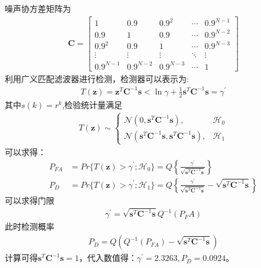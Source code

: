 \documentclass[fontset=windows]{article}
\numberwithin{figure}{section}
\begin{document}
噪声协方差矩阵为
\begin{align*}
	\mathbf{C}=
	\begin{bmatrix}
		1         & 0.9       & 0.9^2     & \cdots & 0.9^{N-1} \\
		0.9       & 1         & 0.9       & \cdots & 0.9^{N-2} \\
		0.9^2     & 0.9       & 1         & \cdots & 0.9^{N-3} \\
		\vdots    & \vdots    & \vdots    & \ddots & \vdots    \\
		0.9^{N-1} & 0.9^{N-2} & 0.9^{N-3} & \cdots & 1
	\end{bmatrix}
\end{align*}
利用广义匹配滤波器进行检测，检测器可以表示为:
\begin{align*}
	T(\mathbf{z})=\mathbf{z}^T\mathbf{C}^{-1}\mathbf{s}<\ln \gamma+\frac{1}{2}\mathbf{s}^T\mathbf{C}^{-1}\mathbf{s}=\gamma^{\prime}
\end{align*}
其中\(s(k)=r^k\),检验统计量满足
\begin{align*}
	T(\mathbf{z})\sim\left\{
	\begin{matrix}
		\mathcal{N}(0,\mathbf{s}^T\mathbf{C}^{-1}\mathbf{s}),                                     & \mathcal{H}_0 \\
		\mathcal{N}(\mathbf{s}^T\mathbf{C}^{-1}\mathbf{s},\mathbf{s}^T\mathbf{C}^{-1}\mathbf{s}), & \mathcal{H}_1
	\end{matrix}
	\right.
\end{align*}
可以求得：
\begin{align*}
	P_{FA} & =Pr\{T(\mathbf{z})>\gamma^{\prime};\mathcal{H}_0\}=Q\left\{\frac{\gamma^{\prime}}{\sqrt{\mathbf{s}^T\mathbf{C}^{-1}\mathbf{s}}}\right\}                                              \\
	P_D    & =Pr\{T(\mathbf{z})>\gamma^{\prime};\mathcal{H}_1\}=Q\left\{\frac{\gamma^{\prime}}{\sqrt{\mathbf{s}^T\mathbf{C}^{-1}\mathbf{s}}}-\sqrt{\mathbf{s}^T\mathbf{C}^{-1}\mathbf{s}}\right\}
\end{align*}
可以求得门限
\begin{align*}
	\gamma^{\prime}=\sqrt{\mathbf{s}^T\mathbf{C}^{-1}\mathbf{s}}Q^{-1}(P_FA)
\end{align*}
此时检测概率
\begin{align*}
	P_D=Q(Q^{-1}(P_{FA})-\sqrt{\mathbf{s}^T\mathbf{C}^{-1}\mathbf{s}})
\end{align*}
计算可得\(\mathbf{s}^T\mathbf{C}^{-1}\mathbf{s}=1\)，代入数值得：\(\gamma^{\prime}=2.3263,P_D=0.0924\)。
\end{document}
